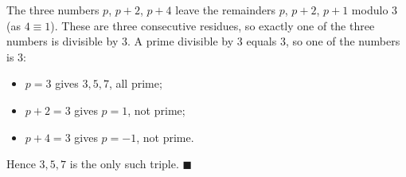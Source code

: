 The three numbers $p$, $p+2$, $p+4$ leave the remainders $p$, $p+2$, $p+1$ modulo $3$ (as $4\equiv1$). These are three consecutive residues, so exactly one of the three numbers is divisible by $3$. A prime divisible by $3$ equals $3$, so one of the numbers is $3$:
\begin{itemize}
\item $p=3$ gives $3,5,7$, all prime;
\item $p+2=3$ gives $p=1$, not prime;
\item $p+4=3$ gives $p=-1$, not prime.
\end{itemize}
Hence $3,5,7$ is the only such triple. $\blacksquare$
